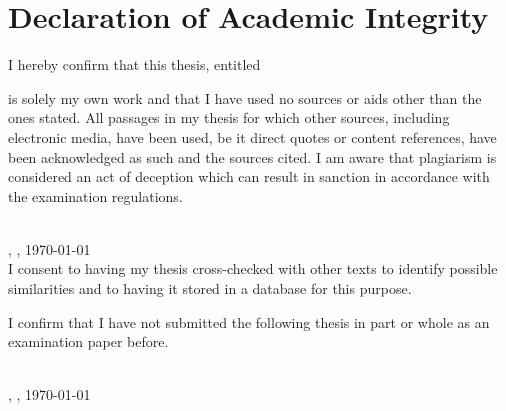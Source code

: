 \chapter*{Declaration of Academic Integrity}

I hereby confirm that this thesis, entitled 

\begin{center}
\textit{\printtitle}
\end{center}

 is solely my own work and that I have used no sources or aids other than the ones stated. All passages in my thesis for which other sources, including electronic media, have been used, be it direct quotes or content references, have been acknowledged as such and the sources cited. I am aware that plagiarism is considered an act of deception which can result in sanction in accordance with the examination regulations.


\vspace{0.75cm}
\parbox{17em}{\hrulefill} \\
\printname, \printcity, \today \\




I consent to having my thesis cross-checked with other texts to identify possible similarities and to having it stored in a database for this purpose.

I confirm that I have not submitted the following thesis in part or whole as an examination paper before.

\vspace{0.75cm}
\parbox{17em}{\hrulefill} \\
\printname, \printcity, \today


